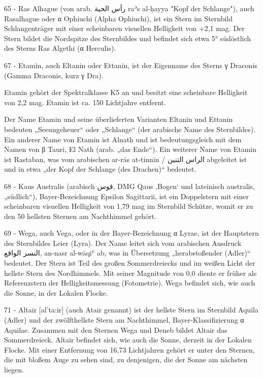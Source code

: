 65 - Ras Alhague (von arab. رأس الحية raʾs al-ḥayya "Kopf der Schlange"), auch Rasalhague oder α Ophiuchi (Alpha Ophiuchi), ist ein Stern im Sternbild Schlangenträger mit einer scheinbaren visuellen Helligkeit von +2,1 mag. Der Stern bildet die Nordspitze des Sternbildes und befindet sich etwa 5° südöstlich des Sterns Ras Algethi (α Herculis). 


67 - Etamin, auch Eltanin oder Ettanin, ist der Eigenname des Sterns γ Draconis (Gamma Draconis, kurz γ Dra).

Etamin gehört der Spektralklasse K5 an und besitzt eine scheinbare Helligkeit von 2,2 mag. Etamin ist ca. 150 Lichtjahre entfernt.

Der Name Etamin und seine überlieferten Varianten Eltanin und Ettanin bedeuten „Seeungeheuer“ oder „Schlange“ (der arabische Name des Sternbildes). Ein anderer Name von Etamin ist Alnath und ist bedeutungsgleich mit dem Namen von β Tauri, El Nath (arab. „das Ende“). Ein weiterer Name von Etamin ist Rastaban, was vom arabischen ar-rās at-tinnīn / الراس التنين abgeleitet ist und in etwa „der Kopf der Schlange (des Drachen)“ bedeutet. 


68 - Kaus Australis (arabisch قوس, DMG Qaus ‚Bogen‘ und lateinisch australis, „südlich“), Bayer-Bezeichnung Epsilon Sagittarii, ist ein Doppelstern mit einer scheinbaren visuellen Helligkeit von 1,79 mag im Sternbild Schütze, womit er zu den 50 hellsten Sternen am Nachthimmel gehört. 



69 - Wega, auch Vega, oder in der Bayer-Bezeichnung α Lyrae, ist der Hauptstern des Sternbildes Leier (Lyra). Der Name leitet sich vom arabischen Ausdruck النسر الواقع, an-nasr al-wāqiʿ ab, was in Übersetzung „herabstoßender (Adler)“ bedeutet. Der Stern ist Teil des großen Sommerdreiecks und im weißen Licht der hellste Stern des Nordhimmels. Mit seiner Magnitude von 0,0 diente er früher als Referenzstern der Helligkeitsmessung (Fotometrie). Wega befindet sich, wie auch die Sonne, in der Lokalen Flocke. 



71 - Altair [al'ta:ir] (auch Atair genannt) ist der hellste Stern im Sternbild Aquila (Adler) und der zwölfthellste Stern am Nachthimmel, Bayer-Klassifizierung α Aquilae. Zusammen mit den Sternen Wega und Deneb bildet Altair das Sommerdreieck. Altair befindet sich, wie auch die Sonne, derzeit in der Lokalen Flocke. Mit einer Entfernung von 16,73 Lichtjahren gehört er unter den Sternen, die mit bloßem Auge zu sehen sind, zu denjenigen, die der Sonne am nächsten liegen. 



